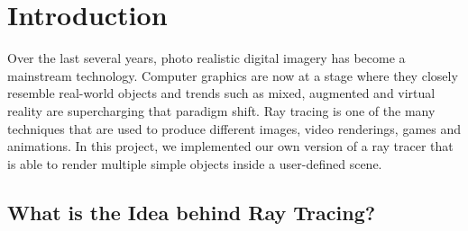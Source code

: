 \documentclass[a4paper]{report}
\begin{document}
	\chapter{Introduction}
	Over the last several years, photo realistic digital imagery has become a mainstream technology. Computer graphics are now at a stage where they closely resemble real-world objects and trends such as mixed, augmented and virtual reality are supercharging that paradigm shift. Ray tracing is one of the many techniques that are used to produce different images, video renderings, games and animations. In this project, we implemented our own version of a ray tracer that is able to render multiple simple objects inside a user-defined scene. 
	
	\section{What is the Idea behind  Ray Tracing?}
	
\end{document}
